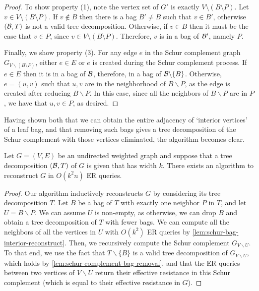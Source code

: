 {\begin{proof}
    To show property (1), note the vertex set of $G'$ is exactly $V \setminus (B \setminus P)$.
    Let $v \in V \setminus (B \setminus P)$.
    If $v \notin B$ then there is a bag $B'\neq B$ such that $v \in B'$, otherwise $({\cal B}, T)$ is not a valid tree decomposition.
    Otherwise, if $v \in B$ then it must be the case that $v\in P$, since $v\in V \setminus (B \setminus P)$.  Therefore, $v$ is in a bag of ${\cal B}'$, namely $P$.

    Finally, we show property (3). For any edge $e$ in the Schur complement graph $G_{V\backslash(B \setminus P)}$, either $e\in E$ or $e$ is created during the Schur complement process. 
    If $e\in E$ then it is in a bag of ${\cal B}$, therefore, in a bag of ${\cal B}\backslash\{B\}$. 
    Otherwise, $e = (u,v)$ such that $u,v$ are in the neighborhood of $B\backslash P$, as the edge is created after reducing $B\backslash P$.
    In this case, since all the neighbors of $B\backslash P$ are in $P$, we have that $u,v\in P$, as desired.
\end{proof}
Having shown both that we can obtain the entire adjacency of `interior vertices' of a leaf bag, and that removing such bags gives a tree decomposition of the Schur complement with those vertices eliminated, the algorithm becomes clear.
\begin{theorem}
    \label{thm:reconstruction-from-tree-decomp}
    Let $G=(V,E)$ be an undirected weighted graph and suppose that a tree decomposition $({\cal B}, T)$ of $G$ is given that has width $k$.
    There exists an algorithm to reconstruct $G$ in $O(k^2n)$ ER queries.
\end{theorem}
\begin{proof}
    Our algorithm inductively reconstructs $G$ by considering its tree decomposition $T$.
    Let $B$ be a bag of $T$ with exactly one neighbor $P$ in $T$, and let $U = B\backslash P$.  We can assume $U$ is non-empty, as otherwise, we can drop $B$ and obtain a tree decomposition of $T$ with fewer bags.  We can compute all the neighbors of all the vertices in $U$ with $O(k^2)$ ER queries by \cref{lem:schur-bag-interior-reconstruct}.  Then, we recursively compute the Schur complement $G_{V\backslash U}$.  To that end, we use the fact that $T\backslash\{B\}$ is a valid tree decomposition of $G_{V\backslash U}$, which holds by \cref{lem:schur-complement-bag-removal}, and that the ER queries between two vertices of $V\backslash U$ return their effective resistance in this Schur complement (which is equal to their effective resistance in $G$).


\end{proof}}

